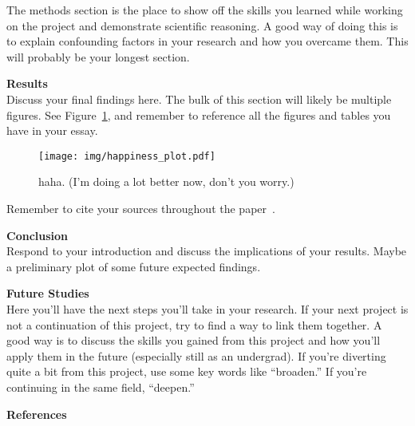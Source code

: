 \documentclass[12pt, letterpaper, twocolumn]{article}
\begin{document}
The methods section is the place to show off the skills you learned while working on the project and demonstrate scientific reasoning. A good way of doing this is to explain confounding factors in your research and how you overcame them. This will probably be your longest section.

\vspace{0.125in}
\noindent\textbf{Results}\\
Discuss your final findings here. The bulk of this section will likely be multiple figures. See Figure~\ref{fig:AnotherFigure}, and remember to reference all the figures and tables you have in your essay.

\begin{figure}[ht]
    \centering
    \texttt{[image: img/happiness\_plot.pdf]}
    \caption{haha. (I'm doing a lot better now, don't you worry.)}
    \label{fig:AnotherFigure}
\end{figure}

Remember to cite your sources throughout the paper~\cite{this_article}.

\vspace{0.125in}
\noindent\textbf{Conclusion}\\
Respond to your introduction and discuss the implications of your results. Maybe a preliminary plot of some future expected findings.

\vspace{0.125in}
\noindent\textbf{Future Studies}\\
Here you'll have the next steps you'll take in your research. If your next project is not a continuation of this project, try to find a way to link them together. A good way is to discuss the skills you gained from this project and how you'll apply them in the future (especially still as an undergrad). If you're diverting quite a bit from this project, use some key words like ``broaden.'' If you're continuing in the same field, ``deepen.''

\vspace{0.125in}
\noindent\textbf{References}
\vspace{-0.125in}
\printbibliography[heading=none]
\end{document}
